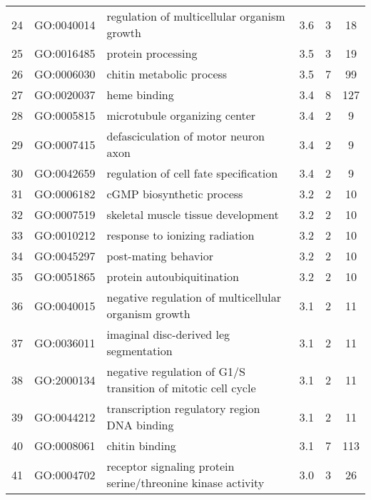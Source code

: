 \begin{tabular}{c|c|p{3in}|c|c|c}
24	&GO:0040014	&regulation of multicellular organism growth	&3.6	&3	&18\\
25	&GO:0016485	&protein processing	&3.5	&3	&19\\
26	&GO:0006030	&chitin metabolic process	&3.5	&7	&99\\
27	&GO:0020037	&heme binding	&3.4	&8	&127\\
28	&GO:0005815	&microtubule organizing center	&3.4	&2	&9\\
29	&GO:0007415	&defasciculation of motor neuron axon	&3.4	&2	&9\\
30	&GO:0042659	&regulation of cell fate specification	&3.4	&2	&9\\
31	&GO:0006182	&cGMP biosynthetic process	&3.2	&2	&10\\
32	&GO:0007519	&skeletal muscle tissue development	&3.2	&2	&10\\
33	&GO:0010212	&response to ionizing radiation	&3.2	&2	&10\\
34	&GO:0045297	&post-mating behavior	&3.2	&2	&10\\
35	&GO:0051865	&protein autoubiquitination	&3.2	&2	&10\\
36	&GO:0040015	&negative regulation of multicellular organism growth	&3.1	&2	&11\\
37	&GO:0036011	&imaginal disc-derived leg segmentation	&3.1	&2	&11\\
38	&GO:2000134	&negative regulation of G1/S transition of mitotic cell cycle	&3.1	&2	&11\\
39	&GO:0044212	&transcription regulatory region DNA binding	&3.1	&2	&11\\
40	&GO:0008061	&chitin binding	&3.1	&7	&113\\
41	&GO:0004702	&receptor signaling protein serine/threonine kinase activity	&3.0	&3	&26\\
\end{tabular}
